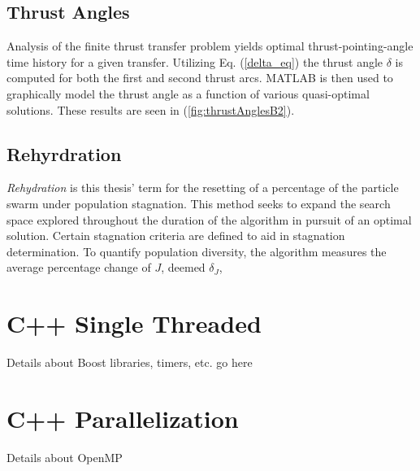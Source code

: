 \subsection{Thrust Angles}

\noindent Analysis of the finite thrust transfer problem yields optimal thrust-pointing-angle time history for a given transfer. 
Utilizing Eq. (\ref{delta_eq}) the thrust angle $\delta$ is computed for both the first and second thrust arcs. MATLAB is then used
to graphically model the thrust angle as a function of various quasi-optimal solutions. These results are seen in 
(\ref{fig:thrustAnglesB2}). \newline

\subsection{Rehyrdration}

\noindent \textit{Rehydration} is this thesis' term for the resetting of a percentage of the particle swarm under population stagnation.
This method seeks to expand the search space explored throughout the duration of the algorithm in pursuit of an optimal solution. Certain
stagnation criteria are defined to aid in stagnation determination. To quantify population diversity, the algorithm measures the average
percentage change of $J$, deemed $\delta_J$, 

\section{C++ Single Threaded}
\noindent Details about Boost libraries, timers, etc. go here
\section{C++ Parallelization}
\noindent Details about OpenMP

\newpage